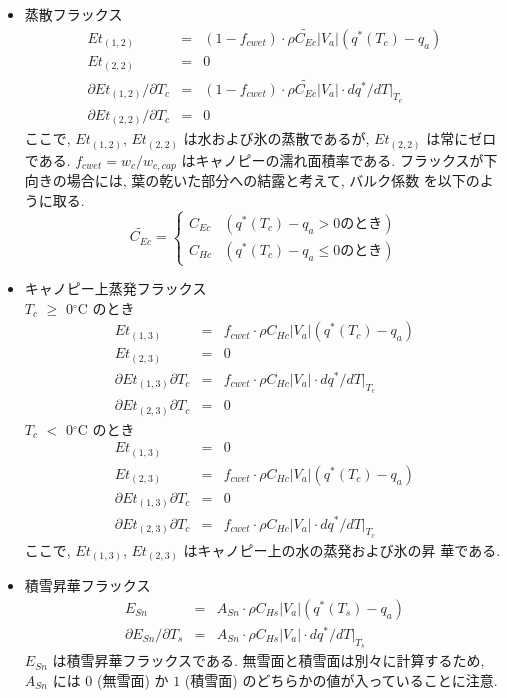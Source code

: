 \begin{itemize}
\item 蒸散フラックス
 \begin{eqnarray}
 Et_{(1,2)} &=& (1-f_{cwet}) \cdot \rho \widetilde{C_{Ec}}|V_a|(q^*(T_c) - q_a) \\
 Et_{(2,2)} &=& 0 \\
 \partial Et_{(1,2)}/\partial T_c &=&
  (1-f_{cwet}) \cdot \rho \widetilde{C_{Ec}}|V_a|\cdot dq^*/dT|_{T_c} \\
 \partial Et_{(2,2)}/\partial T_c &=& 0
 \end{eqnarray}
ここで, $Et_{(1,2)}$, $Et_{(2,2)}$ は水および氷の蒸散であるが,
$Et_{(2,2)}$ は常にゼロである.
$f_{cwet} = w_c / w_{c,cap}$ はキャノピーの濡れ面積率である.
フラックスが下向きの場合には, 葉の乾いた部分への結露と考えて, バルク係数
を以下のように取る.
 \begin{equation}
  \widetilde{C_{Ec}} = \left\{
  \begin{array}{ll}
   C_{Ec}& (q^*(T_c) - q_a > 0 \mbox{のとき})\\
   C_{Hc}& (q^*(T_c) - q_a \leq 0 \mbox{のとき})
  \end{array}
  \right.
 \end{equation}

\item キャノピー上蒸発フラックス \\
%
$T_c$ $\geq$ 0$^{\circ}$C のとき
 \begin{eqnarray}
 Et_{(1,3)} &=&
  f_{cwet} \cdot \rho C_{Hc}|V_a|(q^*(T_c) - q_a) \\
 Et_{(2,3)} &=& 0 \\
 \partial Et_{(1,3)} \partial T_c &=&
  f_{cwet} \cdot \rho C_{Hc}|V_a|\cdot dq^*/dT|_{T_c} \\
 \partial Et_{(2,3)} \partial T_c &=& 0
 \end{eqnarray}
$T_c$ $<$ 0$^{\circ}$C のとき
 \begin{eqnarray}
 Et_{(1,3)} &=& 0 \\
 Et_{(2,3)} &=&
  f_{cwet} \cdot \rho C_{Hc}|V_a|(q^*(T_c) - q_a) \\
 \partial Et_{(1,3)} \partial T_c &=& 0 \\
 \partial Et_{(2,3)} \partial T_c &=&
  f_{cwet} \cdot \rho C_{Hc}|V_a|\cdot dq^*/dT|_{T_c}
 \end{eqnarray}
ここで, $Et_{(1,3)}$, $Et_{(2,3)}$ はキャノピー上の水の蒸発および氷の昇
華である.

\item 積雪昇華フラックス
 \begin{eqnarray}
 E_{Sn} &=& A_{Sn}\cdot \rho C_{Hs}|V_a|(q^*(T_s) - q_a) \\
 \partial E_{Sn}/\partial T_s &=& A_{Sn}\cdot \rho C_{Hs}|V_a|
 \cdot dq^*/dT|_{T_s}
 \end{eqnarray}
$E_{Sn}$ は積雪昇華フラックスである.
無雪面と積雪面は別々に計算するため, $A_{Sn}$ には $0$ (無雪面) か $1$
(積雪面) のどちらかの値が入っていることに注意.
\end{itemize}

